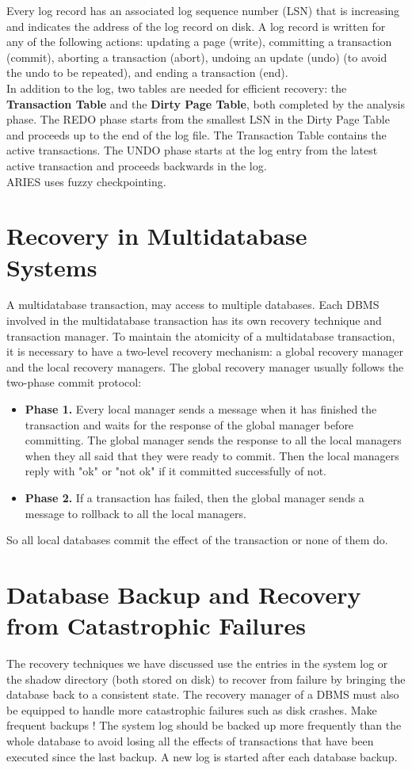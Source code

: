 Every log record has an associated log sequence number (LSN) that is increasing and indicates the address of the log record on disk. A log record is written for any of the following actions: updating a page (write), committing a transaction (commit), aborting a transaction (abort), undoing an update (undo) (to avoid the undo to be repeated), and ending a transaction (end).\\

In addition to the log, two tables are needed for efficient recovery: the \textbf{Transaction Table} and the \textbf{Dirty Page Table}, both completed by the analysis phase. The REDO phase starts from the smallest LSN in the Dirty Page Table and proceeds up to the end of the log file. The Transaction Table contains the active transactions. The UNDO phase starts at the log entry from the latest active transaction and proceeds backwards in the log.\\

ARIES uses fuzzy checkpointing.

\section{Recovery in Multidatabase Systems}
A multidatabase transaction, may access to multiple databases. Each DBMS involved in the multidatabase transaction has its own recovery technique and transaction manager. To maintain the atomicity of a multidatabase transaction, it is necessary to have a two-level recovery mechanism: a global recovery manager and the local recovery managers. The global recovery manager usually follows the two-phase commit protocol:
\begin{itemize}
    \item \textbf{Phase 1.} Every local manager sends a message when it has finished the transaction and waits for the response of the global manager before committing. The global manager sends the response to all the local managers when they all said that they were ready to commit. Then the local managers reply with "ok" or "not ok" if it committed successfully of not.
    \item \textbf{Phase 2.} If a transaction has failed, then the global manager sends a message to rollback to all the local managers.
\end{itemize}
So all local databases commit the effect of the transaction or none of them do.

\section{Database Backup and Recovery from Catastrophic Failures}
The recovery techniques we have discussed use the entries in the system log or the shadow directory (both stored on disk) to recover from failure by bringing the database back to a consistent state. The recovery manager of a DBMS must also be equipped to handle more catastrophic failures such as disk crashes. Make frequent backups ! The system log should be backed up more frequently than the whole database to avoid losing all the effects of transactions that have been executed since the last backup. A new log is started after each database backup.

